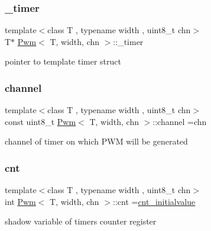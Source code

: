 \subsubsection{\texorpdfstring{\_timer}{\_timer}}
{\footnotesize\ttfamily template$<$class T , typename width , uint8\+\_\+t chn$>$ \\
T$\ast$ \mbox{\hyperlink{class_pwm}{Pwm}}$<$ T, width, chn $>$\+::\+\_\+timer\hspace{0.3cm}{\ttfamily [private]}}



pointer to template timer struct 

\mbox{\label{class_pwm_af854993c7cdd5069144ec812e976ecec}} 
\subsubsection{\texorpdfstring{channel}{channel}}
{\footnotesize\ttfamily template$<$class T , typename width , uint8\+\_\+t chn$>$ \\
const uint8\+\_\+t \mbox{\hyperlink{class_pwm}{Pwm}}$<$ T, width, chn $>$\+::channel =chn\hspace{0.3cm}{\ttfamily [private]}}



channel of timer on which P\+WM will be generated 

\mbox{\label{class_pwm_aff1e9a509192f990362149d140c088c5}} 
\subsubsection{\texorpdfstring{cnt}{cnt}}
{\footnotesize\ttfamily template$<$class T , typename width , uint8\+\_\+t chn$>$ \\
int \mbox{\hyperlink{class_pwm}{Pwm}}$<$ T, width, chn $>$\+::cnt =\mbox{\hyperlink{class_pwm_a427493526d0462d93d2724109c1be87d}{cnt\+\_\+initialvalue}}\hspace{0.3cm}{\ttfamily [private]}}



shadow variable of timers counter register 

\mbox{\label{class_pwm_a427493526d0462d93d2724109c1be87d}} 
